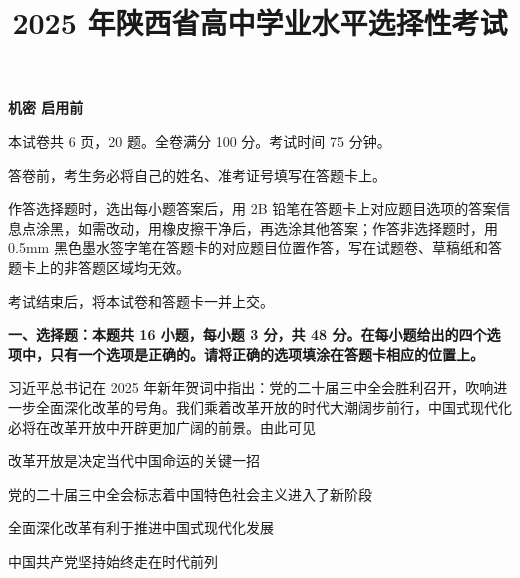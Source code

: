 \documentclass{exam-zh}
\title{2025 年陕西省高中学业水平选择性考试}
\begin{document}
\begin{flushleft}
  {\bfseries 机密 \star 启用前}
\end{flushleft}
\vspace{-1em}

\maketitle

本试卷共 6 页，20 题。全卷满分 100 分。考试时间 75 分钟。

\begin{notice}[][itemsep=0pt, parsep=0pt, topsep=0pt, partopsep=0pt]
\item 答卷前，考生务必将自己的姓名、准考证号填写在答题卡上。
\item 作答选择题时，选出每小题答案后，用 2B 铅笔在答题卡上对应题目选项的答案信息点涂黑，如需改动，用橡皮擦干净后，再选涂其他答案；作答非选择题时，用 0.5mm 黑色墨水签字笔在答题卡的对应题目位置作答，写在试题卷、草稿纸和答题卡上的非答题区域均无效。
\item 考试结束后，将本试卷和答题卡一并上交。
\end{notice}

\begin{flushleft}
  {\bfseries 一、选择题：本题共 16 小题，每小题 3 分，共 48 分。在每小题给出的四个选项中，只有一个选项是正确的。请将正确的选项填涂在答题卡相应的位置上。}
\end{flushleft}
\vspace{-1em}

\begin{question}
  习近平总书记在 2025 年新年贺词中指出：党的二十届三中全会胜利召开，吹响进一步全面深化改革的号角。我们乘着改革开放的时代大潮阔步前行，中国式现代化必将在改革开放中开辟更加广阔的前景。由此可见

   改革开放是决定当代中国命运的关键一招

   党的二十届三中全会标志着中国特色社会主义进入了新阶段

   全面深化改革有利于推进中国式现代化发展

   中国共产党坚持始终走在时代前列

  \begin{choices}
  \item {}
  \item {}
  \item {}
  \item {}
  \end{choices}
\end{question}
\end{document}
